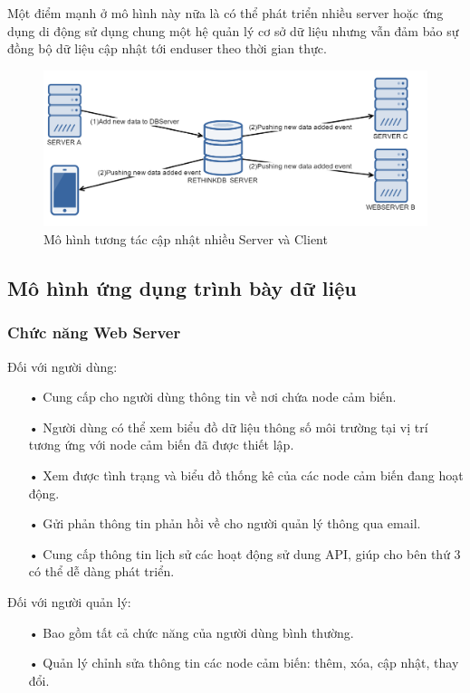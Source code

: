 Một điểm mạnh ở mô hình này nữa là có thể phát triển nhiều server hoặc ứng dụng di động sử dụng chung một hệ quản lý cơ sở dữ liệu nhưng vẫn đảm bảo sự đồng bộ dữ liệu cập nhật tới enduser theo thời gian thực.
\begin{figure}[H]
	\centering    
	\includegraphics[width=1.0\textwidth]{multiserver}
	\caption[Mô hình tương tác cập nhật nhiều Server]{Mô hình tương tác cập nhật nhiều Server và Client}
	\label{fig: multiserver}
\end{figure}
\subsection{Mô hình ứng dụng trình bày dữ liệu}
\subsubsection*{Chức năng Web Server}
Đối với người dùng:
\begin{itemize}
\item[•] Cung cấp cho người dùng thông tin về nơi chứa node cảm biến.
\item[•] Người dùng có thể xem biểu đồ dữ liệu thông số môi trường tại vị trí tương ứng với node cảm biến đã được thiết lập.
\item[•] Xem được tình trạng và biểu đồ thống kê của các node cảm biến đang hoạt động.
\item[•] Gửi phản thông tin phản hồi về cho người quản lý thông qua email.
\item[•] Cung cấp thông tin lịch sử các hoạt động sử dung API, giúp cho bên thứ 3 có thể dễ dàng phát triển.
\end{itemize}

Đối với người quản lý:
\begin{itemize}
\item[•] Bao gồm tất cả chức năng của người dùng bình thường.
\item[•] Quản lý chỉnh sửa thông tin các node cảm biến: thêm, xóa, cập nhật, thay đổi.
\end{itemize}

